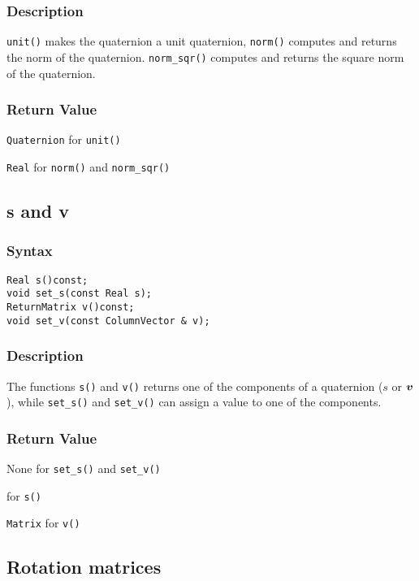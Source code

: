\documentclass[dvips,11pt,fleqn]{report}
\newcommand{\mbold}[1]{\mbox{\boldmath $ #1 $}}
\begin{document}
\subsubsection{Description}
\texttt{unit()} makes the quaternion a unit quaternion,
\texttt{norm()} computes and returns the norm of the quaternion.
\texttt{norm\_sqr()} computes and returns the square norm of the quaternion.

\subsubsection*{Return Value}

{\tt Quaternion} for \texttt{unit()}

\noindent \texttt{Real} for \texttt{norm()} and \texttt{norm\_sqr()}

\newpage

\subsection*{s and v}

\subsubsection*{Syntax}
\begin{verbatim}
Real s()const;
void set_s(const Real s);
ReturnMatrix v()const;
void set_v(const ColumnVector & v);
\end{verbatim}
\subsubsection{Description}
The functions \texttt{s()} and \texttt{v()} returns one of the
components of a quaternion ($s$ or $\mbold{v}$), while
\texttt{set\_s()} and \texttt{set\_v()} can assign a value to one of
the components.

\subsubsection*{Return Value}

None for \texttt{set\_s()} and \texttt{set\_v()}

 for \texttt{s()}

\noindent \texttt{Matrix} for \texttt{v()}

\newpage

\subsection*{Rotation matrices}
\end{document}
